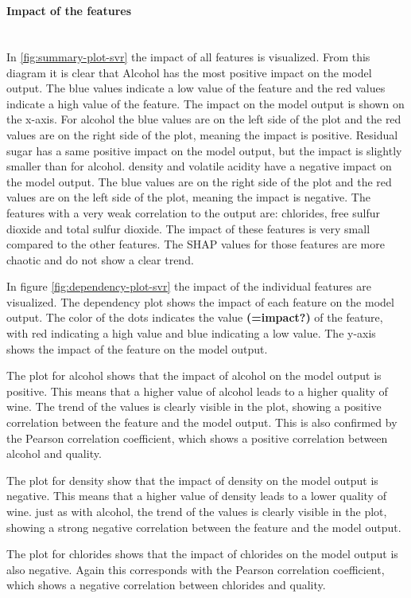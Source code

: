 \documentclass{article}
\newcommand{\subsubsubsection}[1]{%
  \paragraph{#1}\mbox{}\\}
\begin{document}
\subsubsubsection{Impact of the features}
In \autoref{fig:summary-plot-svr}  the impact of all features is visualized.
From this diagram it is clear that Alcohol has the most positive impact on the model output.
The blue values indicate a low value of the feature and the red values indicate a high value of the feature.
The impact on the model output is shown on the x-axis. For alcohol the blue values are on the left side of the plot and the red values are on the right side of the plot, meaning the impact is positive.
Residual sugar has a same positive impact on the model output, but the impact is slightly smaller than for alcohol.
density and volatile acidity have a negative impact on the model output. The blue values are on the right side of the plot and the red values are on the left side of the plot, meaning the impact is negative.
The features with a very weak correlation to the output are: chlorides, free sulfur dioxide and total sulfur dioxide. The impact of these features is very small compared to the other features.
The SHAP values for those features are more chaotic and do not show a clear trend.

In figure \autoref{fig:dependency-plot-svr}  the impact of the individual features are visualized.
The dependency plot shows the impact of each feature on the model output.
The color of the dots indicates the value \textbf{(=impact?)} of the feature, with red indicating a high value and blue indicating a low value.
The y-axis shows the impact of the feature on the model output.

The plot for alcohol shows that the impact of alcohol on the model output is positive.
This means that a higher value of alcohol leads to a higher quality of wine.
The trend of the values is clearly visible in the plot, showing a positive correlation between the feature and the model output. %
This is also confirmed by the Pearson correlation coefficient, which shows a positive correlation between alcohol and quality.

The plot for density show that the impact of density on the model output is negative.
This means that a higher value of density leads to a lower quality of wine.
just as with alcohol, the trend of the values is clearly visible in the plot, showing a strong negative correlation between the feature and the model output.

The plot for chlorides shows that the impact of chlorides on the model output is also negative. Again this corresponds with the Pearson correlation coefficient, which shows a negative correlation between chlorides and quality.
\end{document}
